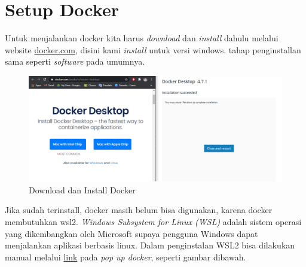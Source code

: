 \documentclass[11pt,a4paper]{article}
\begin{document}
\section{Setup Docker}
Untuk menjalankan docker kita harus \textit{download} dan \textit{install} dahulu melalui website \href{https://www.docker.com/products/docker-desktop/}{docker.com}, disini kami \textit{install} untuk versi windows. tahap penginstallan sama seperti \textit{software} pada umumnya.
    \begin{figure}[h]
        \centering
        \includegraphics[width=1\textwidth]{Figure/1. install.png}
        \caption{Download dan Install Docker}
    \end{figure}
Jika sudah terinstall, docker masih belum bisa digunakan, karena docker membutuhkan wsl2. \textit{Windows Subsystem for Linux (WSL)} adalah sistem operasi yang dikembangkan oleh Microsoft supaya pengguna Windows dapat menjalankan aplikasi berbasis linux. 
\vspace{5cm}
\newline
Dalam penginstalan WSL2 bisa dilakukan manual melalui \href{https://docs.microsoft.com/en-us/windows/wsl/install-manual#step-1---enable-the-windows-subsystem-for-linux}{link} pada \textit{pop up docker}, seperti gambar dibawah.
\end{document}
